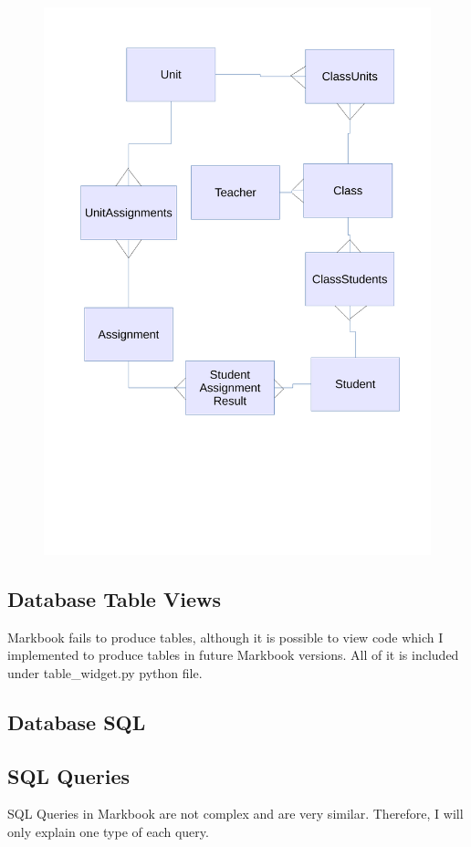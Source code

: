 \begin{figure}[H]
    \includegraphics[width=\textwidth]{./Images/ER Diagram (Revised).pdf}
    \caption{} \label{}
\end{figure}

\subsection{Database Table Views}
Markbook fails to produce tables, although it is possible to view code which I implemented to produce tables in future Markbook versions. All of it is included under table_widget.py python file. 

\subsection{Database SQL}

\subsection{SQL Queries}
SQL Queries in Markbook are not complex and are very similar. Therefore, I will only explain one type of each query.

